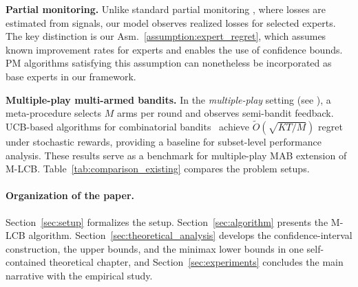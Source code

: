 \documentclass[a4paper,14pt]{extarticle}
\theoremstyle{plain}
\newcommand{\algname}[1]{{\textsf  #1}}
\begin{document}
\textbf{Partial monitoring.}
Unlike standard partial monitoring \cite{cesa2006prediction}, where losses are estimated from signals, our model observes realized losses for selected experts. The key distinction is our Asm.~\ref{assumption:expert_regret}, which assumes known improvement rates for experts and enables the use of confidence bounds. PM algorithms satisfying this assumption can nonetheless be incorporated as base experts in our framework.


\textbf{Multiple-play multi-armed bandits.}
In the \emph{multiple-play} setting (see \cite{agrawal1990multi,uchiya2010algorithms}),
a meta-procedure selects $M$ arms per round and observes semi-bandit feedback.
UCB-based algorithms for combinatorial bandits~\cite{kveton2015tight}
achieve $\tilde O(\sqrt{KT/M})$ regret under stochastic rewards,
providing a baseline for subset-level performance analysis. These results serve as a benchmark for multiple-play MAB extension of \algname{M-LCB}. Table~\ref{tab:comparison_existing} compares the problem setups.

\paragraph{Organization of the paper.}
Section~\ref{sec:setup} formalizes the setup.
Section~\ref{sec:algorithm} presents the \algname{M-LCB} algorithm.
Section~\ref{sec:theoretical_analysis} develops the confidence-interval construction, the upper bounds, and the minimax lower bounds in one self-contained theoretical chapter, and Section~\ref{sec:experiments} concludes the main narrative with the empirical study.
\end{document}
